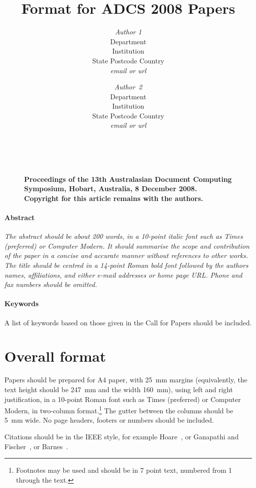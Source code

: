 \documentclass[twocolumn]{article}
\title{Format for ADCS 2008 Papers}
\author{{\em Author 1}\\[1ex]
        Department\\Institution\\State Postcode Country\\[1ex]
        {\em email or url} \and
        {\em Author~2}\\[1ex]
        Department\\Institution\\State Postcode Country\\[1ex]
        {\em email or url}}
\date{}
\begin{document}
\maketitle
\thispagestyle{empty}


        \begin{figure}[b]
	~\\
        \noindent
        {\small\raggedright\bf
        Proceedings of the 13th Australasian 
	Document Computing Symposium,
	Hobart, Australia,
        8 December 2008.
	Copyright for this article remains with the authors.
        }
        \end{figure}


\paragraph*{Abstract}
\noindent
{\it 
The abstract should be about 200 words, in a 10-point italic
font such as Times (preferred) or Computer Modern.
It should summarise the scope and contribution of the paper in a
concise and accurate manner without references to other works.
The title should be centred in a 14-point Roman bold font followed by
the authors names, affiliations, and either e-mail addresses or home
page URL.
Phone and fax numbers should be omitted.
} 

\paragraph*{Keywords} 
A list of keywords based on those given in the Call for Papers should
be included.


\section{Overall format}

Papers should be prepared for A4 paper, with 25~mm margins
(equivalently, the text height should be 247~mm and the width 160~mm),
using left and right justification, in a 10-point Roman font such as
Times (preferred) or Computer Modern, in two-column
format.\footnote{Footnotes may be used and should be in 7 point text,
  numbered from 1 through the text.}  The gutter between the columns
should be 5~mm wide.  No page headers, footers or numbers should be
included.

Citations should be in the IEEE style, for example
Hoare~\cite{Hoare73}, or Ganapathi and
Fischer~\cite{GanapathiFischer82}, or Barnes~\cite{Barnes80,Barnes89}.
\end{document}
